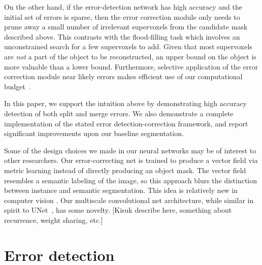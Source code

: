 \documentclass{article}
\begin{document}
On the other hand, if the error-detection network has high accuracy and the initial set of errors is sparse, then the error correction module only needs to prune away a small number of irrelevant supervoxels from the candidate mask described above. This contrasts with the flood-filling task which involves an unconstrained search for a few supervoxels to add. Given that most supervoxels are \textit{not} a part of the object to be reconstructed, an upper bound on the object is more valuable than a lower bound. Furthermore, selective application of the error correction module near likely errors makes efficient use of our computational budget~\cite{multipass}.

In this paper, we support the intuition above by demonstrating high accuracy detection of both split and merge errors. We also demonstrate a complete implementation of the stated error detection-correction framework, and report significant improvements upon our baseline segmentation.


Some of the design choices we made in our neural networks may be of interest to other researchers. Our error-correcting net is trained to produce a vector field via metric learning instead of directly producing an object mask. The vector field resembles a semantic labeling of the image, so this approach blurs the distinction between instance and semantic segmentation. This idea is relatively new in computer vision \cite{harley2015metric,fathi2017metric,brabandere2017metric}. Our multiscale convolutional net architecture, while similar in spirit to UNet~\cite{unet}, has some novelty.  [Kisuk describe here, something about recurrence, weight sharing, etc.]

\section{Error detection}
\end{document}
